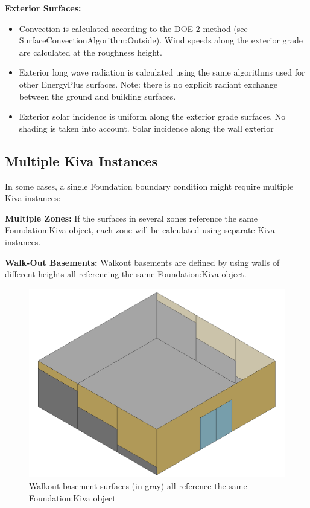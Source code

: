 \textbf{Exterior Surfaces:}

\begin{itemize}
\tightlist
\item
  Convection is calculated according to the DOE-2 method (see
  SurfaceConvectionAlgorithm:Outside). Wind speeds along the exterior
  grade are calculated at the roughness height.
\item
  Exterior long wave radiation is calculated using the same algorithms
  used for other EnergyPlus surfaces. Note: there is no explicit radiant
  exchange between the ground and building surfaces.
\item
  Exterior solar incidence is uniform along the exterior grade surfaces.
  No shading is taken into account. Solar incidence along the wall
  exterior
\end{itemize}

\subsection{Multiple Kiva Instances}

In some cases, a single Foundation boundary condition might require
multiple Kiva instances:

\textbf{Multiple Zones:} If the surfaces in several zones reference the
same Foundation:Kiva object, each zone will be calculated using separate
Kiva instances.

\textbf{Walk-Out Basements:} Walkout basements are defined by using
walls of different heights all referencing the same Foundation:Kiva
object.

\begin{figure}
\centering
\includegraphics{media/kiva-walkout-segs.png}
\caption{Walkout basement surfaces (in gray) all reference the same
Foundation:Kiva object\label{fig:wo-s2}}
\end{figure}

